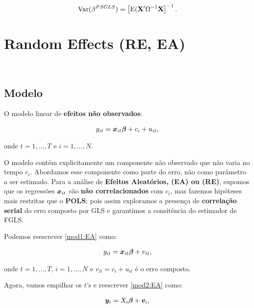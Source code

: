 \documentclass[11pt, oneside, a4paper, article]{article}
\numberwithin{equation}{section}
\begin{document}
\begin{description}
\vspace{-1.5 em}
\begin{align*}
	\text{Var}(\beta^{FSGLS}) = \left[ \text{E}(\mathbf{X}' \Omega^{-1} \mathbf{X} \right]^{-1}.
\end{align*}

\clearpage
\section{Random Effects (RE, EA)}
\noindent
\citet[Sec.10.4 -- Random Effects Methods, p.257]{wool-2010} \\

\subsection{Modelo}

O modelo linear de \textbf{efeitos não observados}:

\vspace{-1 em}
\begin{align} \label{mod1:EA}
	y_{it} = \boldsymbol{x}_{it} \boldsymbol{\beta} + c_{i} + u_{it},
\end{align}

\noindent
onde
$t = 1, \dots, T$ e $i = 1, \dots, N$.

O modelo contém explicitamente um componente não observado que não varia no tempo $c_{i}$.
Abordamos esse componente como parte do erro, não como parâmetro a ser estimado.
Para a análise de \textbf{Efeitos Aleatórios, (EA) ou (RE)}, supomos que os regressões $\boldsymbol{x}_{it}$ são \textbf{não correlacionados} com $c_{i}$, mas fazemos hipóteses mais restritas que o \textbf{POLS}; pois assim exploramos a presença de \textbf{correlação serial} do erro composto por GLS e garantimos a consitência do estimador de FGLS.

Podemos reescrever \eqref{mod1:EA} como:

\vspace{-1 em}
\begin{align} \label{mod2:EA}
	y_{it} = \boldsymbol{x}_{it} \boldsymbol{\beta} + v_{it},
\end{align}

\noindent
onde
$t = 1, \dots, T$, $i = 1, \dots, N$ e $\boxed{v_{it} = c_{i} + u_{it}}$ é o erro composto.

Agora, vamos empilhar os $t$'s e reescrever \eqref{mod2:EA} como:

\vspace{-1 em}
\begin{align} \label{mod3:EA}
	\boldsymbol{y}_{i} = X_{i} \boldsymbol{\beta} + \boldsymbol{v}_{i},
\end{align}


\end{description}
\end{document}
